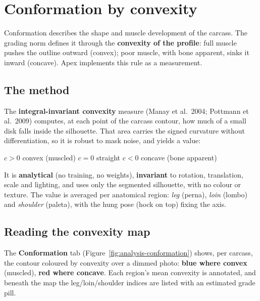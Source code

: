 \chapter{Conformation by convexity}


\vspace{4pt}
Conformation describes the shape and muscle development of the carcass. The
grading norm defines it through the \textbf{convexity of the profile}: full muscle
pushes the outline outward (convex); poor muscle, with bone apparent, sinks it
inward (concave). Apex implements this rule as a measurement.

\section{The method}

The \textbf{integral-invariant convexity} measure (Manay et al.\ 2004; Pottmann
et al.\ 2009) computes, at each point of the carcass contour, how much of a small
disk falls inside the silhouette. That area carries the signed curvature without
differentiation, so it is robust to mask noise, and yields a value:

\begin{center}
\ttfamily $c > 0$ \rm convex (muscled) \quad\textbullet\quad
\ttfamily $c = 0$ \rm straight \quad\textbullet\quad
\ttfamily $c < 0$ \rm concave (bone apparent)
\end{center}

It is \textbf{analytical} (no training, no weights), \textbf{invariant} to
rotation, translation, scale and lighting, and uses only the segmented silhouette,
with no colour or texture. The value is averaged per anatomical region: \emph{leg}
(perna), \emph{loin} (lombo) and \emph{shoulder} (paleta), with the hung pose
(hock on top) fixing the axis.

\section{Reading the convexity map}

The \textbf{Conformation} tab (Figure~\ref{fig:analysis-conformation}) shows, per
carcass, the contour coloured by convexity over a dimmed photo: \textbf{blue where
convex} (muscled), \textbf{red where concave}. Each region's mean convexity is
annotated, and beneath the map the leg/loin/shoulder indices are listed with an
estimated grade pill.

